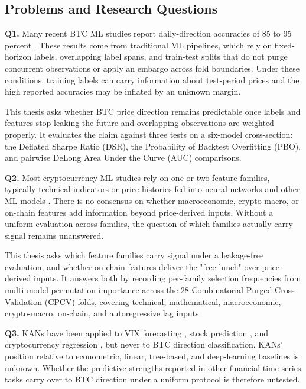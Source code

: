 \documentclass[12pt,a4paper,oneside]{article}
\begin{document}
\subsection{Problems and Research Questions}\label{subsec:objectives}


\textbf{Q1.} Many recent BTC ML studies report daily-direction accuracies of 85 to 95 percent \citep{omole_enke_2024}. These results come from traditional ML pipelines, which rely on fixed-horizon labels, overlapping label spans, and train-test splits that do not purge concurrent observations or apply an embargo across fold boundaries. Under these conditions, training labels can carry information about test-period prices and the high reported accuracies may be inflated by an unknown margin.

This thesis asks whether BTC price direction remains predictable once labels and features stop leaking the future and overlapping observations are weighted properly. It evaluates the claim against three tests on a six-model cross-section: the Deflated Sharpe Ratio (DSR), the Probability of Backtest Overfitting (PBO), and pairwise DeLong Area Under the Curve (AUC) comparisons.


\textbf{Q2.} Most cryptocurrency ML studies rely on one or two feature families, typically technical indicators or price histories fed into neural networks and other ML models \citep{bourday_crypto_dl_2024}. There is no consensus on whether macroeconomic, crypto-macro, or on-chain features add information beyond price-derived inputs. Without a uniform evaluation across families, the question of which families actually carry signal remains unanswered.

This thesis asks which feature families carry signal under a leakage-free evaluation, and whether on-chain features deliver the "free lunch" over price-derived inputs. It answers both by recording per-family selection frequencies from multi-model permutation importance across the 28 Combinatorial Purged Cross-Validation (CPCV) folds, covering technical, mathematical, macroeconomic, crypto-macro, on-chain, and autoregressive lag inputs.


\textbf{Q3.} KANs have been applied to VIX forecasting \citep{cho_lee_kim_2025}, stock prediction \citep{oad_kasper_2025}, and cryptocurrency regression \citep{gao_decokan_2025}, but never to BTC direction classification. KANs' position relative to econometric, linear, tree-based, and deep-learning baselines is unknown. Whether the predictive strengths reported in other financial time-series tasks carry over to BTC direction under a uniform protocol is therefore untested.
\end{document}
